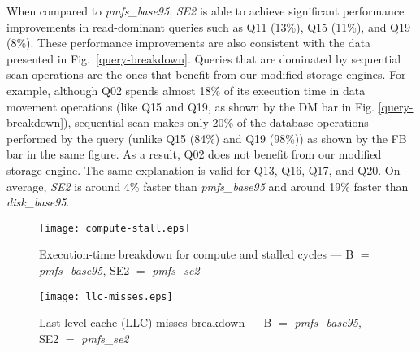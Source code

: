 When compared to \textit{pmfs\_base95}, \textit{SE2} is able to achieve significant performance improvements in read-dominant queries such as Q11 (13\%), Q15 (11\%), and Q19 (8\%). These performance improvements are also consistent with the data presented in Fig.~\ref{query-breakdown}. Queries that are dominated by sequential scan operations are the ones that benefit from our modified storage engines. For example, although Q02 spends almost 18\% of its execution time in data movement operations (like Q15 and Q19, as shown by the DM bar in Fig. \ref{query-breakdown}), sequential scan makes only 20\% of the database operations performed by the query (unlike Q15 (84\%) and Q19 (98\%)) as shown by the FB bar in the same figure. As a result, Q02 does not benefit from our modified storage engine. The same explanation is valid for Q13, Q16, Q17, and Q20. On average, \textit{SE2} is around 4\% faster than \textit{pmfs\_base95} and around 19\% faster than \textit{disk\_base95}.

\begin{figure*}
\centering
\texttt{[image: compute-stall.eps]}
\caption{Execution-time breakdown for compute and stalled cycles --- B $=$ \textit{pmfs\_base95}, SE2 $=$ \textit{pmfs\_se2}}
\label{fig:compute-stall}
\end{figure*}

\begin{figure*}
\centering
\texttt{[image: llc-misses.eps]}
\caption{Last-level cache (LLC) misses breakdown --- B $=$ \textit{pmfs\_base95}, SE2 $=$ \textit{pmfs\_se2}}
\label{fig:llc-misses}
\end{figure*}


